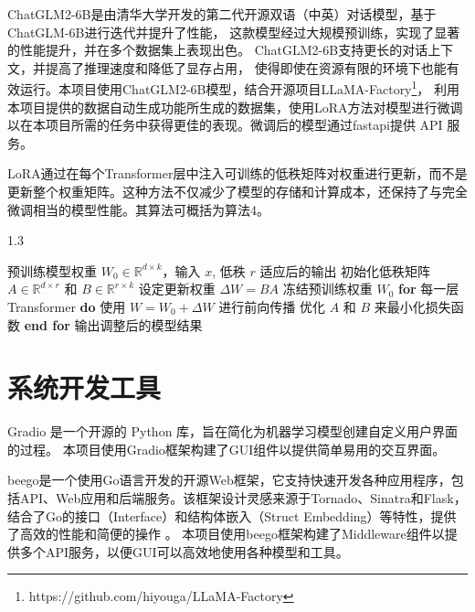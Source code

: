 \documentclass[a4paper,AutoFakeBold,oneside,12pt]{book}
\begin{document}
ChatGLM2-6B是由清华大学开发的第二代开源双语（中英）对话模型，基于ChatGLM-6B进行迭代并提升了性能，
这款模型经过大规模预训练，实现了显著的性能提升，并在多个数据集上表现出色。
ChatGLM2-6B支持更长的对话上下文，并提高了推理速度和降低了显存占用，
使得即使在资源有限的环境下也能有效运行。本项目使用ChatGLM2-6B模型，结合开源项目LLaMA-Factory\footnote{https://github.com/hiyouga/LLaMA-Factory}，
利用本项目提供的数据自动生成功能所生成的数据集，使用LoRA\cite{hu2021lora}方法对模型进行微调以在本项目所需的任务中获得更佳的表现。微调后的模型通过fastapi提供 API 服务。

LoRA通过在每个Transformer层中注入可训练的低秩矩阵对权重进行更新，而不是更新整个权重矩阵。这种方法不仅减少了模型的存储和计算成本，还保持了与完全微调相当的模型性能。其算法可概括为算法4。
\begin{algorithm}
    \begin{spacing}{1.3}
        \caption{LoRA: 低秩适应大型语言模型} 
        \label{alg:LoRA}
        \renewcommand{\algorithmicrequire}{\textbf{输入：}}
        \renewcommand{\algorithmicensure}{\textbf{输出：}} 
        \begin{algorithmic}[1] 
            \Require 预训练模型权重 $W_0 \in \mathbb{R}^{d \times k}$，输入 $x$, 低秩 $r$
            \Ensure 适应后的输出
            \State 初始化低秩矩阵 $A \in \mathbb{R}^{d \times r}$ 和 $B \in \mathbb{R}^{r \times k}$
            \State 设定更新权重 $\Delta W = BA$
            \State 冻结预训练权重 $W_0$
            \State \textbf{for} 每一层Transformer \textbf{do}
            \State \hspace{\algorithmicindent} 使用 $W = W_0 + \Delta W$ 进行前向传播
            \State \hspace{\algorithmicindent} 优化 $A$ 和 $B$ 来最小化损失函数
            \State \textbf{end for}
            \State 输出调整后的模型结果
        \end{algorithmic}
    \end{spacing}
\end{algorithm}

\section{系统开发工具}
Gradio 是一个开源的 Python 库，旨在简化为机器学习模型创建自定义用户界面的过程。
本项目使用Gradio框架构建了GUI组件以提供简单易用的交互界面。

beego是一个使用Go语言开发的开源Web框架，它支持快速开发各种应用程序，包括API、Web应用和后端服务。该框架设计灵感来源于Tornado、Sinatra和Flask，结合了Go的接口（Interface）和结构体嵌入（Struct Embedding）等特性，提供了高效的性能和简便的操作​ 。
本项目使用beego框架构建了Middleware组件以提供多个API服务，以便GUI可以高效地使用各种模型和工具。
\end{document}
